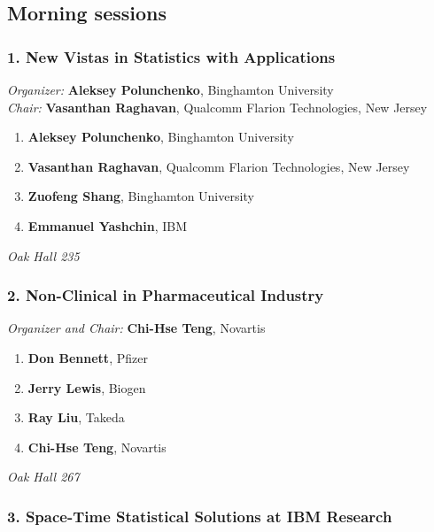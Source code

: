 
\subsection*{Morning sessions}

\subsubsection*{1. New Vistas in Statistics with Applications}

\emph{Organizer:} \textbf{Aleksey Polunchenko}, Binghamton University \\
\emph{Chair:} \textbf{Vasanthan Raghavan}, Qualcomm Flarion Technologies, New Jersey

\begin{enumerate}
\item \textbf{Aleksey Polunchenko}, Binghamton University 
\item \textbf{Vasanthan Raghavan}, Qualcomm Flarion Technologies, New Jersey 
\item \textbf{Zuofeng Shang}, Binghamton University 
\item \textbf{Emmanuel Yashchin}, IBM 
\end{enumerate}

\emph{Oak Hall 235} \\[.5em]

\subsubsection*{2. Non-Clinical in Pharmaceutical Industry}

\emph{Organizer and Chair:} \textbf{Chi-Hse Teng}, Novartis

\begin{enumerate}
\item \textbf{Don Bennett}, Pfizer 
\item \textbf{Jerry Lewis}, Biogen 
\item \textbf{Ray Liu}, Takeda 
\item \textbf{Chi-Hse Teng}, Novartis 
\end{enumerate}

\emph{Oak Hall 267} \\[.5em]

\subsubsection*{3. Space-Time Statistical Solutions at IBM Research}


